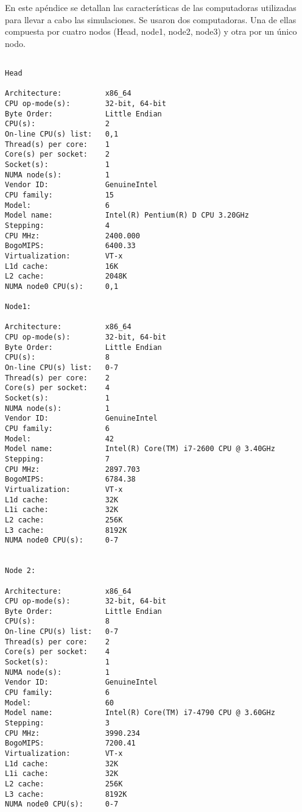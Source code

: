 \label{caracteristicas_tecnicas}

En este apéndice se detallan las características de las computadoras utilizadas para llevar a cabo las simulaciones. Se usaron dos computadoras. Una de ellas compuesta por cuatro nodos (Head, node1, node2, node3) y otra por un único nodo. 

\begin{verbatim}

Head

Architecture:          x86_64
CPU op-mode(s):        32-bit, 64-bit
Byte Order:            Little Endian
CPU(s):                2
On-line CPU(s) list:   0,1
Thread(s) per core:    1
Core(s) per socket:    2
Socket(s):             1
NUMA node(s):          1
Vendor ID:             GenuineIntel
CPU family:            15
Model:                 6
Model name:            Intel(R) Pentium(R) D CPU 3.20GHz
Stepping:              4
CPU MHz:               2400.000
BogoMIPS:              6400.33
Virtualization:        VT-x
L1d cache:             16K
L2 cache:              2048K
NUMA node0 CPU(s):     0,1

Node1:

Architecture:          x86_64
CPU op-mode(s):        32-bit, 64-bit
Byte Order:            Little Endian
CPU(s):                8
On-line CPU(s) list:   0-7
Thread(s) per core:    2
Core(s) per socket:    4
Socket(s):             1
NUMA node(s):          1
Vendor ID:             GenuineIntel
CPU family:            6
Model:                 42
Model name:            Intel(R) Core(TM) i7-2600 CPU @ 3.40GHz
Stepping:              7
CPU MHz:               2897.703
BogoMIPS:              6784.38
Virtualization:        VT-x
L1d cache:             32K
L1i cache:             32K
L2 cache:              256K
L3 cache:              8192K
NUMA node0 CPU(s):     0-7


Node 2:

Architecture:          x86_64
CPU op-mode(s):        32-bit, 64-bit
Byte Order:            Little Endian
CPU(s):                8
On-line CPU(s) list:   0-7
Thread(s) per core:    2
Core(s) per socket:    4
Socket(s):             1
NUMA node(s):          1
Vendor ID:             GenuineIntel
CPU family:            6
Model:                 60
Model name:            Intel(R) Core(TM) i7-4790 CPU @ 3.60GHz
Stepping:              3
CPU MHz:               3990.234
BogoMIPS:              7200.41
Virtualization:        VT-x
L1d cache:             32K
L1i cache:             32K
L2 cache:              256K
L3 cache:              8192K
NUMA node0 CPU(s):     0-7



\end{verbatim}
